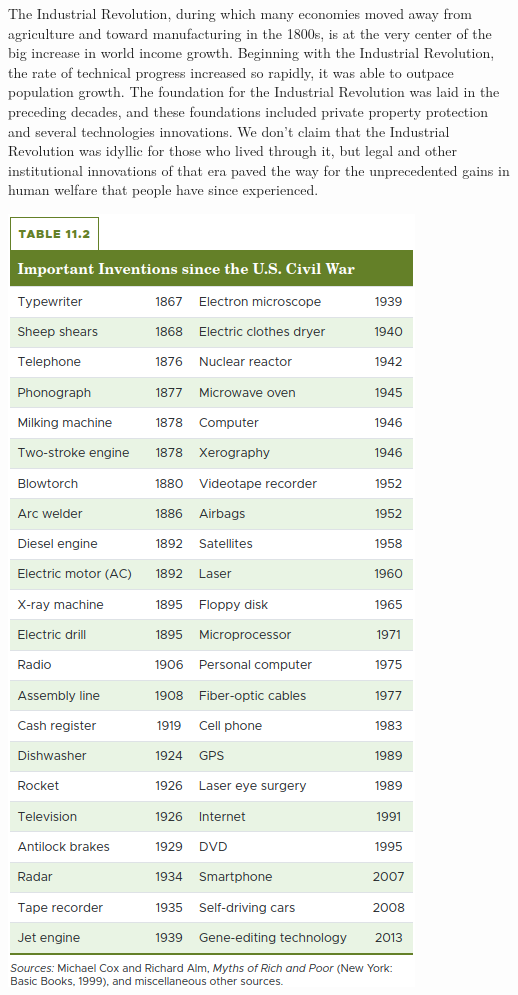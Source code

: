 \documentclass[11pt]{article} %
\theoremstyle{plain}
\theoremstyle{definition}
\begin{document}
The Industrial Revolution, during which many economies moved away from agriculture and toward manufacturing in the 1800s, is at the very center of the big increase in world income growth. Beginning with the Industrial Revolution, the rate of technical progress increased so rapidly, it was able to outpace population growth. The foundation for the Industrial Revolution was laid in the preceding decades, and these foundations included private property protection and several technologies innovations. We don't claim that the Industrial Revolution was idyllic for those who lived through it, but legal and other institutional innovations of that era paved the way for the unprecedented gains in human welfare that people have since experienced.
\begin{center}
\includegraphics[scale=0.5]{../../images/Chapter 11/table 11.2.png}
\end{center}
\end{document}
